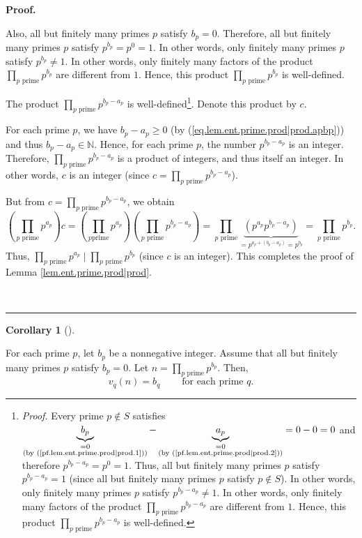 \documentclass[numbers=enddot,12pt,final,onecolumn,notitlepage]{scrartcl}%
\numberwithin{exer}{subsection}
\theoremstyle{definition}
\newtheorem{coro}[theo]{Corollary}
\newenvironment{corollary}[1][]
{\begin{coro}[#1]\begin{leftbar}}
{\end{leftbar}\end{coro}}
\newenvironment{fineprint}{\begin{small}}{\end{small}}
\newenvironment{proof}[1][Proof]{\noindent\textbf{#1.} }{\ \rule{0.5em}{0.5em}}
\let\prodnonlimits\prod
\renewcommand{\prod}{\prodnonlimits\limits}
\begin{document}
\begin{proof}
\begin{fineprint}
Also, all but finitely many primes $p$ satisfy $b_{p}=0$. Therefore, all but
finitely many primes $p$ satisfy $p^{b_{p}}=p^{0}=1$. In other words, only
finitely many primes $p$ satisfy $p^{b_{p}}\neq1$. In other words, only
finitely many factors of the product $\prod_{p\text{ prime}}p^{b_{p}}$ are
different from $1$. Hence, this product $\prod_{p\text{ prime}}p^{b_{p}}$ is well-defined.

The product $\prod_{p\text{ prime}}p^{b_{p}-a_{p}}$ is
well-defined\footnote{\textit{Proof. }Every prime $p\notin S$ satisfies
$\underbrace{b_{p}}_{\substack{=0\\\text{(by
(\ref{pf.lem.ent.prime.prod|prod.1}))}}}-\underbrace{a_{p}}%
_{\substack{=0\\\text{(by (\ref{pf.lem.ent.prime.prod|prod.2}))}}}=0-0=0$ and
therefore $p^{b_{p}-a_{p}}=p^{0}=1$. Thus, all but finitely many primes $p$
satisfy $p^{b_{p}-a_{p}}=1$ (since all but finitely many primes $p$ satisfy
$p\notin S$). In other words, only finitely many primes $p$ satisfy
$p^{b_{p}-a_{p}}\neq1$. In other words, only finitely many factors of the
product $\prod_{p\text{ prime}}p^{b_{p}-a_{p}}$ are different from $1$. Hence,
this product $\prod_{p\text{ prime}}p^{b_{p}-a_{p}}$ is well-defined.}. Denote
this product by $c$.

For each prime $p$, we have $b_{p}-a_{p}\geq0$ (by
(\ref{eq.lem.ent.prime.prod|prod.apbp})) and thus $b_{p}-a_{p}\in\mathbb{N}$.
Hence, for each prime $p$, the number $p^{b_{p}-a_{p}}$ is an integer.
Therefore, $\prod_{p\text{ prime}}p^{b_{p}-a_{p}}$ is a product of integers,
and thus itself an integer. In other words, $c$ is an integer (since
$c=\prod_{p\text{ prime}}p^{b_{p}-a_{p}}$).

But from $c=\prod_{p\text{ prime}}p^{b_{p}-a_{p}}$, we obtain%
\[
\left(  \prod_{p\text{ prime}}p^{a_{p}}\right)  c=\left(  \prod_{p\text{
prime}}p^{a_{p}}\right)  \left(  \prod_{p\text{ prime}}p^{b_{p}-a_{p}}\right)
=\prod_{p\text{ prime}}\underbrace{\left(  p^{a_{p}}p^{b_{p}-a_{p}}\right)
}_{=p^{a_{p}+\left(  b_{p}-a_{p}\right)  }=p^{b_{p}}}=\prod_{p\text{ prime}%
}p^{b_{p}}.
\]
Thus, $\prod_{p\text{ prime}}p^{a_{p}}\mid\prod_{p\text{ prime}}p^{b_{p}}$
(since $c$ is an integer). This completes the proof of Lemma
\ref{lem.ent.prime.prod|prod}.
\end{fineprint}
\end{proof}

\begin{corollary}
\label{cor.ent.prime.vp-of-can}For each prime $p$, let $b_{p}$ be a
nonnegative integer. Assume that all but finitely many primes $p$ satisfy
$b_{p}=0$. Let $n=\prod_{p\text{ prime}}p^{b_{p}}$. Then,%
\[
v_{q}\left(  n\right)  =b_{q}\ \ \ \ \ \ \ \ \ \ \text{for each prime }q.
\]

\end{corollary}
\end{document}
